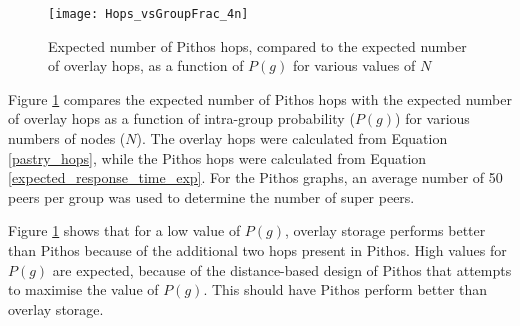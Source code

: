 \begin{figure}[htbp]
 \centering
 \texttt{[image: Hops\_vsGroupFrac\_4n]}
 \caption{Expected number of Pithos hops, compared to the expected number of overlay hops, as a function of $P(g)$ for various values of $N$}
 \label{fig_hop_compare}
\end{figure}
%
Figure \ref{fig_hop_compare} compares the expected number of Pithos hops with the expected number of overlay hops as a function of intra-group
probability ($P(g)$) for various numbers of nodes ($N$). The overlay hops were calculated from Equation \eqref{pastry_hops}, while the Pithos hops
were calculated from Equation \eqref{expected_response_time_exp}. For the Pithos graphs, an average number of 50 peers per group was used to
determine the number of super peers.

Figure \ref{fig_hop_compare} shows that for a low value of $P(g)$, overlay storage performs better than Pithos because of the additional two hops
present in Pithos. High values for $P(g)$ are expected, because of the distance-based design of Pithos that attempts to maximise the value of $P(g)$.
This should have Pithos perform better than overlay storage.
